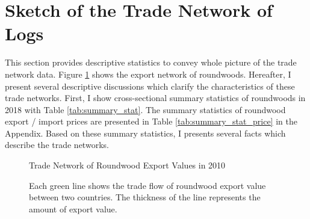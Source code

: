 \documentclass[a4paper,12pt]{article}
\begin{document}
\section{Sketch of the Trade Network of Logs}


This section provides descriptive statistics to convey whole picture of the trade network data. Figure \ref{fig:export_network} shows the export network of roundwoods. Hereafter, I present several descriptive discussions which clarify the characteristics of these trade networks. First, I show cross-sectional summary statistics of roundwoods in 2018 with Table \ref{tab:summary_stat}. The summary statistics of roundwood export / import prices are presented in Table \ref{tab:summary_stat_price} in the Appendix. Based on these summary statistics, I presents several facts which describe the trade networks.\\

\begin{figure}[H] 
    \centering
    \caption{Trade Network of Roundwood Export Values in 2010}
    \caption*{\small{Each green line shows the trade flow of roundwood export value between two countries. The thickness of the line represents the amount of export value.}}
    \label{fig:export_network}
\end{figure}
\end{document}
